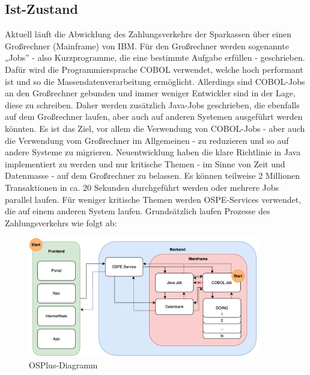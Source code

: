 \subsection{Ist-Zustand}
\label{sec:ist-zustand}
Aktuell läuft die Abwicklung des Zahlungsverkehrs der Sparkassen über einen Großrechner (Mainframe) von IBM.
Für den Großrechner werden sogenannte „Jobs” - also Kurzprogramme, die eine bestimmte Aufgabe erfüllen - geschrieben. Dafür wird die Programmiersprache COBOL verwendet, welche hoch performant ist und so die Massendatenverarbeitung ermöglicht.
Allerdings sind COBOL-Jobs an den Großrechner gebunden und immer weniger Entwickler sind in der Lage, diese zu schreiben.
Daher werden zusätzlich Java-Jobs geschrieben, die ebenfalls auf dem Großrechner laufen, aber auch auf anderen Systemen ausgeführt werden könnten.
Es ist das Ziel, vor allem die Verwendung von COBOL-Jobs - aber auch die Verwendung vom Großrechner im Allgemeinen - zu reduzieren und so auf andere Systeme zu migrieren.
Neuentwicklung haben die klare Richtlinie in Java implementiert zu werden und nur kritische Themen - im Sinne von Zeit und Datenmasse - auf dem Großrechner zu belassen.
Es können teilweise 2 Millionen Transaktionen in ca. 20 Sekunden durchgeführt werden oder mehrere Jobs parallel laufen.
Für weniger kritische Themen werden OSPE-Services verwendet, die auf einem anderen System laufen.
Grundsätzlich laufen Prozesse des Zahlungsverkehrs wie folgt ab:

\begin{figure}[ht]
    \centering\includegraphics[width=0.9\textwidth]{Abbildungen/OSPlus-Diagramm.png}
    \caption{OSPlus-Diagramm}
\end{figure}

